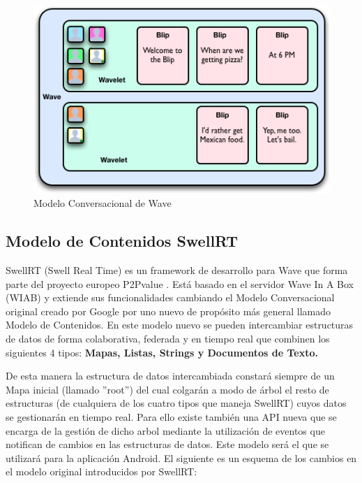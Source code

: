     \begin{figure}[H]
	  \centering
	    \includegraphics[keepaspectratio, scale=0.7]{Media/Captures/waveEntities.png}
	  \caption{Modelo Conversacional de Wave}
	  \label{fig:wave_model}
	\end{figure}
	
	\subsection{Modelo de Contenidos SwellRT}\label{ssec:swellRTModel}
	
	SwellRT \cite{ref:swellRT_github} (Swell Real Time) es un framework de desarrollo para Wave que forma parte del proyecto europeo P2Pvalue \cite{ref:p2pvalue}. Está basado en el servidor Wave In A Box \cite{ref:wave_in_a_box} (WIAB) y extiende sus funcionalidades cambiando el Modelo Conversacional original creado por Google por uno nuevo de propósito más general llamado Modelo de Contenidos. En este modelo nuevo se pueden intercambiar estructuras de datos de forma colaborativa, federada y en tiempo real que combinen los siguientes 4 tipos: \textbf{Mapas, Listas, Strings y Documentos de Texto.}
	
	De esta manera la estructura de datos intercambiada constará siempre de un Mapa inicial (llamado ''root'') del cual colgarán a modo de árbol el resto de estructuras (de cualquiera de los cuatro tipos que maneja SwellRT) cuyos datos se gestionarán en tiempo real. Para ello existe también una API nueva que se encarga de la gestión de dicho arbol mediante la utilización de eventos que notifican de cambios en las estructuras de datos. Este modelo será el que se utilizará para la aplicación Android. El siguiente es un esquema de los cambios en el modelo original introducidos por SwellRT:
	

